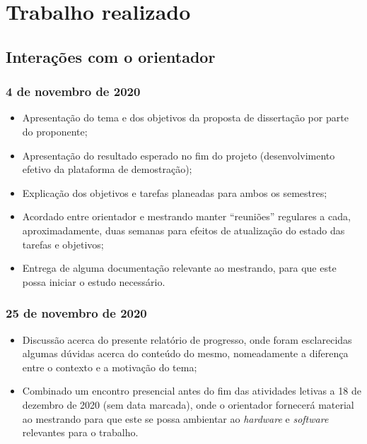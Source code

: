 \section{Trabalho realizado}\label{sec:trabalho}

\subsection{Interações com o orientador}\label{sec:interacoes}

\subsubsection{4 de novembro de 2020}
\begin{itemize}
    \item Apresentação do tema e dos objetivos da proposta de dissertação por parte do proponente;
    \item Apresentação do resultado esperado no fim do projeto (desenvolvimento efetivo da plataforma de demostração);
    \item Explicação dos objetivos e tarefas planeadas para ambos os semestres;
    \item Acordado entre orientador e mestrando manter ``reuniões'' regulares a cada, aproximadamente, duas semanas para efeitos
    de atualização do estado das tarefas e objetivos;
    \item Entrega de alguma documentação relevante ao mestrando, para que este possa iniciar o estudo necessário.
\end{itemize}

\subsubsection{25 de novembro de 2020}
\begin{itemize}
    \item Discussão acerca do presente relatório de progresso, onde foram esclarecidas algumas dúvidas acerca do conteúdo do mesmo,
    nomeadamente a diferença entre o contexto e a motivação do tema;
    \item Combinado um encontro presencial antes do fim das atividades letivas a 18 de dezembro de 2020 (sem data marcada), onde o 
    orientador fornecerá material ao mestrando para que este se possa ambientar ao \textit{hardware} e \textit{software} relevantes para o trabalho.
\end{itemize}



